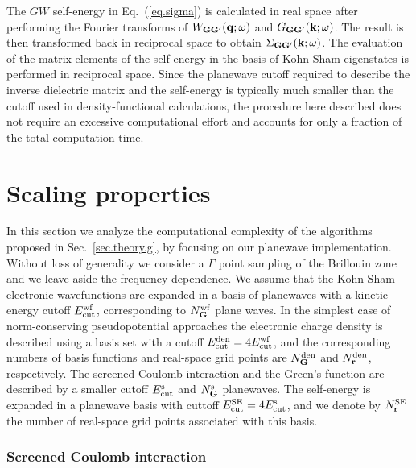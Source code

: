 \documentclass[twocolumn,prb,showpacs,superscriptaddress]{revtex4}
\def\w{\omega}
\def\q{{\bf q}}
\def\k{{\bf k}}
\def\G{{\bf G}}
\def\Gp{{\bf G^\prime}}
\def\r{{\bf r}}
\begin{document}
The $GW$ self-energy in Eq.\ (\ref{eq.sigma}) is calculated in real space
after performing the Fourier transforms of $W_{\G\Gp}(\q;\w)$ and $G_{\G\Gp}(\k;\w)$.
The result is then transformed back in reciprocal space to obtain
$\Sigma_{\G\Gp}(\k;\w)$. The evaluation of the matrix elements of the
self-energy in the basis of Kohn-Sham eigenstates is performed in reciprocal space.
Since the planewave cutoff required to describe the inverse dielectric
matrix and the self-energy is typically much smaller than the cutoff used
in density-functional calculations,\cite{hl86} the procedure here described
does not require an excessive computational effort and accounts for only
a fraction of the total computation time.

\section{Scaling properties}\label{sec.scaling}

In this section we analyze the computational complexity of the algorithms
proposed in Sec.\ \ref{sec.theory.g}, by focusing on our planewave
implementation. Without loss of generality we consider a $\Gamma$ point sampling 
of the Brillouin zone and we leave aside the frequency-dependence.
We assume that the Kohn-Sham electronic wavefunctions are expanded in a basis of planewaves
with a kinetic energy cutoff $E_{\rm cut}^{\rm wf}$, corresponding to
$N_\G^{\rm wf}$ plane waves.
In the simplest case of norm-conserving pseudopotential approaches 
the electronic charge density is described using a basis set with a cutoff
$E_{\rm cut}^{\rm den}=4E_{\rm cut}^{\rm wf}$, and the corresponding numbers 
of basis functions and real-space grid points are $N_\G^{\rm den}$ and
$N_\r^{\rm den}$, respectively. The screened Coulomb interaction and the Green's function
are described by a smaller cutoff $E_{\rm cut}^{\rm s}$ and $N_\G^{\rm s}$
planewaves. The self-energy is expanded in a planewave basis with cuttoff
$E_{\rm cut}^{\rm SE}=4E_{\rm cut}^{\rm s}$, and we denote by $N_\r^{\rm SE}$
the number of real-space grid points associated with this basis.

\subsubsection{Screened Coulomb interaction}\label{sec.coulomb.scaling}
\end{document}
